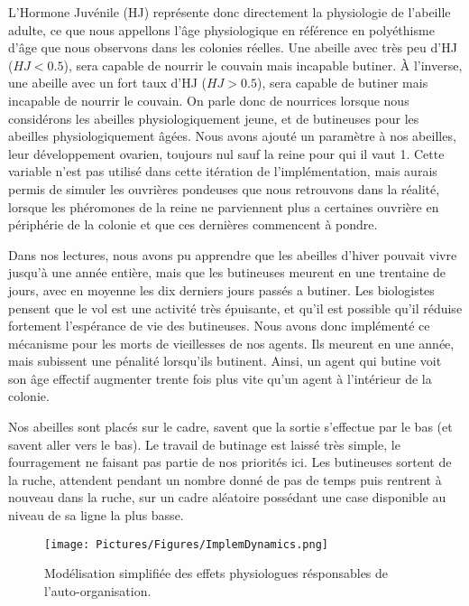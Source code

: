 		L'Hormone Juvénile (HJ) représente donc directement la physiologie de l'abeille adulte, ce que nous appellons l'âge physiologique en référence en polyéthisme d'âge que nous observons dans les colonies réelles. Une abeille avec très peu d'HJ ($HJ < 0.5$), sera capable de nourrir le couvain mais incapable butiner. À l'inverse, une abeille avec un fort taux d'HJ ($HJ > 0.5$), sera capable de butiner mais incapable de nourrir le couvain. On parle donc de nourrices lorsque nous considérons les abeilles physiologiquement jeune, et de butineuses pour les abeilles physiologiquement âgées. Nous avons ajouté un paramètre à nos abeilles, leur développement ovarien, toujours nul sauf la reine pour qui il vaut 1. Cette variable n'est pas utilisé dans cette itération de l'implémentation, mais aurais permis de simuler les ouvrières pondeuses que nous retrouvons dans la réalité, lorsque les phéromones de la reine ne parviennent plus a certaines ouvrière en périphérie de la colonie et que ces dernières commencent à pondre.
		
		Dans nos lectures, nous avons pu apprendre que les abeilles d'hiver pouvait vivre jusqu'à une année entière, mais que les butineuses meurent en une trentaine de jours, avec en moyenne les dix derniers jours passés a butiner. Les biologistes pensent que le vol est une activité très épuisante, et qu'il est possible qu'il réduise fortement l'espérance de vie des butineuses. Nous avons donc implémenté ce mécanisme pour les morts de vieillesses de nos agents. Ils meurent en une année, mais subissent une pénalité lorsqu'ils butinent. Ainsi, un agent qui butine voit son âge effectif augmenter trente fois plus vite qu'un agent à l'intérieur de la colonie.
		
		Nos abeilles sont placés sur le cadre, savent que la sortie s'effectue par le bas (et savent aller vers le bas). Le travail de butinage est laissé très simple, le fourragement ne faisant pas partie de nos priorités ici. Les butineuses sortent de la ruche, attendent pendant un nombre donné de pas de temps puis rentrent à nouveau dans la ruche, sur un cadre aléatoire possédant une case disponible au niveau de sa ligne la plus basse.
		
			
			\begin{figure}
			\centering
			\texttt{[image: Pictures/Figures/ImplemDynamics.png]}
			\caption[Notre modélisation de la physiologie de l'abeille adulte.]{Modélisation simplifiée des effets physiologues résponsables de l'auto-organisation.}
			\label{HJEODynamics}
			\end{figure}
		
